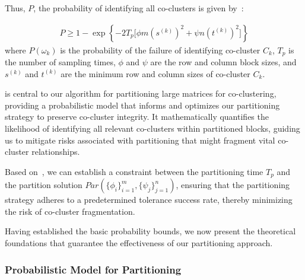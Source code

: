 \documentclass[journal]{IEEEtran}
\begin{document}
Thus, $P$, the probability of identifying all co-clusters is given by~:

\begin{equation}
    \begin{split}
        P \ge 1 - \exp \left\{ -2 T_p \lbrack \phi m (s^{(k)})^2 + \psi n (t^{(k)})^2\rbrack  \right\} \label{eq:prob-of-identifying-all-co-clusters-sec}
    \end{split}
\end{equation}
where $P(\omega_k)$ is the probability of the failure of identifying co-cluster $C_k$, $T_p$ is the number of sampling times, $\phi$ and $\psi$ are the row and column block sizes, and $s^{(k)}$ and $t^{(k)}$ are the minimum row and column sizes of co-cluster $C_k$.

 is central to our algorithm for partitioning large matrices for co-clustering, providing a probabilistic model that informs and optimizes our partitioning strategy to preserve co-cluster integrity. It mathematically quantifies the likelihood of identifying all relevant co-clusters within partitioned blocks, guiding us to mitigate risks associated with partitioning that might fragment vital co-cluster relationships.

Based on~, we can establish a constraint between the partitioning time $T_p$ and the partition solution $Par(\{\phi_i\}_{i=1}^m, \{\psi_j\}_{j=1}^n)$, ensuring that the partitioning strategy adheres to a predetermined tolerance success rate, thereby minimizing the risk of co-cluster fragmentation.

Having established the basic probability bounds, we now present the theoretical foundations that guarantee the effectiveness of our partitioning approach.

\subsubsection{Probabilistic Model for Partitioning}
\label{subsec:probabilistic-model}
\end{document}
